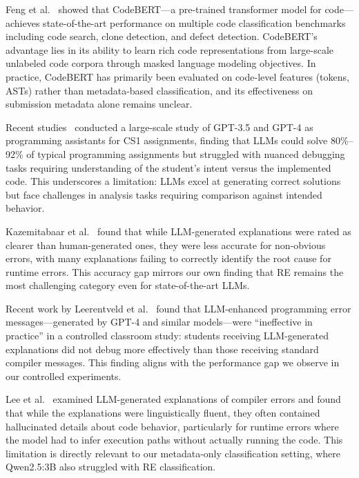 \documentclass[acmsmall]{acmart}
\begin{document}
Feng et al.~\cite{feng2020codebert} showed that CodeBERT---a pre-trained
transformer model for code---achieves state-of-the-art performance on multiple
code classification benchmarks including code search, clone detection, and
defect detection. CodeBERT's advantage lies in its ability to learn rich code
representations from large-scale unlabeled code corpora through masked
language modeling objectives. In practice, CodeBERT has primarily been evaluated
on code-level features (tokens, ASTs) rather than metadata-based
classification, and its effectiveness on submission metadata alone remains
unclear.

Recent studies~\cite{finnie2022robots,kazemitabaar2024impact} conducted a large-scale
study of GPT-3.5 and GPT-4 as programming assistants for CS1 assignments,
finding that LLMs could solve 80\%--92\% of typical programming assignments
but struggled with nuanced debugging tasks requiring understanding of the
student's intent versus the implemented code. This underscores a
limitation: LLMs excel at generating correct solutions but face challenges in
analysis tasks requiring comparison against intended behavior.

Kazemitabaar et al.~\cite{kazemitabaar2024impact} found that while
LLM-generated explanations were rated as clearer than human-generated ones,
they were less accurate for non-obvious errors, with many explanations failing
to correctly identify the root cause for runtime errors. This accuracy gap
mirrors our own finding that RE remains the most challenging category even for
state-of-the-art LLMs.

Recent work by Leerentveld et al.~\cite{leerentveld2024not}
found that LLM-enhanced programming error messages---generated by GPT-4 and
similar models---were ``ineffective in practice'' in a controlled classroom
study: students receiving LLM-generated explanations did not debug more
effectively than those receiving standard compiler messages. This finding
aligns with the performance gap we observe in our controlled experiments.

Lee et al.~\cite{lee2024code}
examined LLM-generated explanations of compiler errors and found that while
the explanations were linguistically fluent, they often contained
hallucinated details about code behavior, particularly for runtime errors
where the model had to infer execution paths without actually running the
code. This limitation is directly relevant to our metadata-only
classification setting, where Qwen2.5:3B also struggled with RE
classification.
\end{document}
